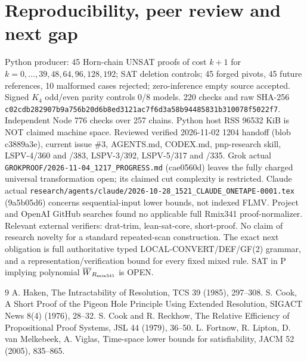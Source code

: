 \documentclass[11pt]{article}
\begin{document}
\section*{Reproducibility, peer review and next gap}
Python producer: 45 Horn-chain UNSAT proofs of cost $k+1$ for $k=0,\ldots,39,48,64,96,128,192$; SAT deletion controls; 45 forged pivots, 45 future references, 10 malformed cases rejected; zero-inference empty source accepted. Signed $K_4$ odd/even parity controls 0/8 models. 220 checks and raw SHA-256 \texttt{c02cdb282907b9a756b20d6b8ed3121ac7f6d3a58b94485831b310078f5022f7}. Independent Node 776 checks over 257 chains. Python host RSS 96532 KiB is NOT claimed machine space.
Reviewed verified 2026-11-02 1204 handoff (blob c3889a3e), current issue \#3, AGENTS.md, CODEX.md, pnp-research skill, LSPV-4/360 and /383, LSPV-3/392, LSPV-5/317 and /335. Grok actual \texttt{GROKPROOF/2026-11-04\_1217\_PROGRESS.md} (cae0560d) leaves the fully charged universal transformation open; its claimed cut complexity is restricted. Claude actual \texttt{research/agents/claude/2026-10-28\_1521\_CLAUDE\_ONETAPE-0001.tex} (9a5b05d6) concerns sequential-input lower bounds, not indexed FLMV. Project and OpenAI GitHub searches found no applicable full Rmix341 proof-normalizer. Relevant external verifiers: drat-trim, lean-sat-core, short-proof. No claim of research novelty for a standard repeated-scan construction.
The exact next obligation is full authoritative typed LOCAL-CONVERT/DEF/GF(2) grammar, and a representation/verification bound for every fixed mixed rule. SAT in P implying polynomial $\overline W_{R_{\rm mix341}}$ is OPEN.
\begin{thebibliography}{9}
 A. Haken, The Intractability of Resolution, TCS 39 (1985), 297--308.
 S. Cook, A Short Proof of the Pigeon Hole Principle Using Extended Resolution, SIGACT News 8(4) (1976), 28--32.
 S. Cook and R. Reckhow, The Relative Efficiency of Propositional Proof Systems, JSL 44 (1979), 36--50.
 L. Fortnow, R. Lipton, D. van Melkebeek, A. Viglas, Time-space lower bounds for satisfiability, JACM 52 (2005), 835--865.
\end{thebibliography}
\end{document}
